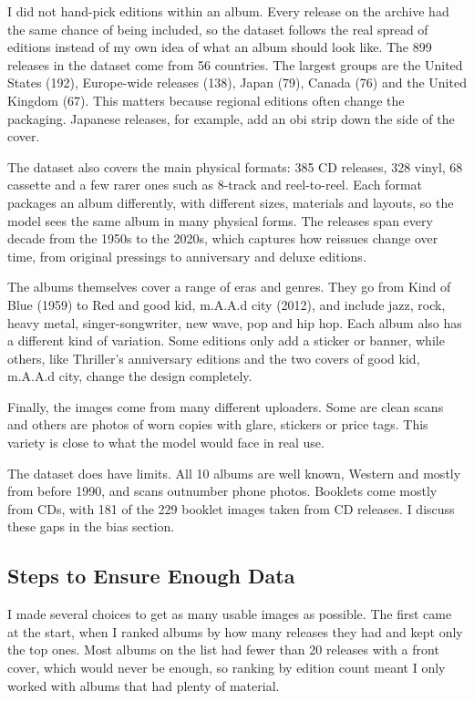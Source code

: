 \documentclass[10pt,a4paper,twocolumn]{article}
\begin{document}
I did not hand-pick editions within an album. Every release on the archive had the same chance of being included, so the dataset follows the real spread of editions instead of my own idea of what an album should look like. The 899 releases in the dataset come from 56 countries. The largest groups are the United States (192), Europe-wide releases (138), Japan (79), Canada (76) and the United Kingdom (67). This matters because regional editions often change the packaging. Japanese releases, for example, add an obi strip down the side of the cover.

The dataset also covers the main physical formats: 385 CD releases, 328 vinyl, 68 cassette and a few rarer ones such as 8-track and reel-to-reel. Each format packages an album differently, with different sizes, materials and layouts, so the model sees the same album in many physical forms. The releases span every decade from the 1950s to the 2020s, which captures how reissues change over time, from original pressings to anniversary and deluxe editions.

The albums themselves cover a range of eras and genres. They go from Kind of Blue (1959) to Red and good kid, m.A.A.d city (2012), and include jazz, rock, heavy metal, singer-songwriter, new wave, pop and hip hop. Each album also has a different kind of variation. Some editions only add a sticker or banner, while others, like Thriller's anniversary editions and the two covers of good kid, m.A.A.d city, change the design completely.

Finally, the images come from many different uploaders. Some are clean scans and others are photos of worn copies with glare, stickers or price tags. This variety is close to what the model would face in real use.

The dataset does have limits. All 10 albums are well known, Western and mostly from before 1990, and scans outnumber phone photos. Booklets come mostly from CDs, with 181 of the 229 booklet images taken from CD releases. I discuss these gaps in the bias section.

\subsection{Steps to Ensure Enough Data}
I made several choices to get as many usable images as possible. The first came at the start, when I ranked albums by how many releases they had and kept only the top ones. Most albums on the list had fewer than 20 releases with a front cover, which would never be enough, so ranking by edition count meant I only worked with albums that had plenty of material.
\end{document}

